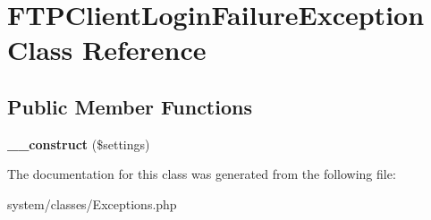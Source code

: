 \hypertarget{class_f_t_p_client_login_failure_exception}{
\section{FTPClientLoginFailureException Class Reference}
\label{class_f_t_p_client_login_failure_exception}
}
\subsection*{Public Member Functions}
\begin{DoxyCompactItemize}
\item 
\hypertarget{class_f_t_p_client_login_failure_exception_adfc5aa93af639780804d02884e934842}{
{\bfseries \_\-\_\-construct} (\$settings)}
\label{class_f_t_p_client_login_failure_exception_adfc5aa93af639780804d02884e934842}

\end{DoxyCompactItemize}


The documentation for this class was generated from the following file:\begin{DoxyCompactItemize}
\item 
system/classes/Exceptions.php\end{DoxyCompactItemize}
